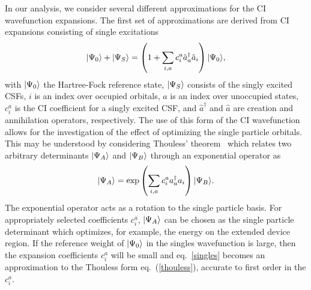 In our analysis, we consider several different approximations for the CI
wavefunction expansions. The first set of approximations are derived from
CI expansions consisting of single excitations 
\begin{equation}
\label{singles}
  |\Psi_0 \rangle + |\Psi_{S} \rangle
  =
  \left(1 + \sum_{i,a} c_i^a \hat{a}_a^\dagger \hat{a}_i \right) |\Psi_0 \rangle,
\end{equation} 
with $|\Psi_0 \rangle$ the Hartree-Fock reference state, $|\Psi_{S} \rangle$
consists of the singly excited CSFs, $i$ is an index over occupied
orbitals, $a$ is an index over unoccupied states, $c_i^a$ is the CI
coefficient for a singly excited CSF, and $\hat{a}^\dagger$ and $\hat{a}$
are creation and annihilation operators, respectively. The use of this
form of the CI wavefunction allows for the investigation of the effect
of optimizing the single particle orbitals. This may be understood by
considering Thouless' theorem~\cite{thouless} which relates two arbitrary
determinants $|\Psi_A \rangle$ and $|\Psi_B \rangle$ through  an exponential
operator as
\begin{equation}
\label{thouless}
|\Psi_A \rangle = \exp \left( \sum_{i,a} c_i^a a_a^\dagger a_i \right) |\Psi_B \rangle.
\end{equation}    
The exponential operator acts as a rotation to the single particle basis.
For appropriately selected coefficients $c_i^a$, $|\Psi_A \rangle$ can be
chosen as the single particle determinant which optimizes, for example,
the energy on the extended device region. If the reference weight of
$|\Psi_0 \rangle$ in the singles wavefunction is large, then the expansion
coefficients $c_i^a$ will be small and eq.~\ref{singles} becomes an
approximation to the Thouless form eq.~(\ref{thouless}), accurate to first
order in the $c_i^a$. 

